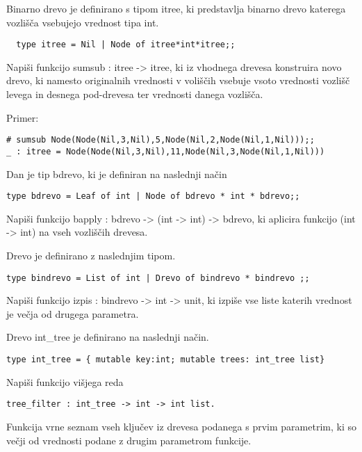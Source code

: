 \begin{ex}
  Binarno drevo je definirano s tipom itree, ki predstavlja binarno
  drevo katerega vozli\v s\v ca vsebujejo vrednost tipa int.
\begin{lstlisting}
  type itree = Nil | Node of itree*int*itree;;
\end{lstlisting}

  Napi\v si funkcijo sumsub : itree -> itree, ki iz vhodnega drevesa
  konstruira novo drevo, ki namesto originalnih vrednosti v voli\v s\v
  cih vsebuje vsoto vrednosti vozli\v s\v c levega in desnega
  pod-drevesa ter vrednosti danega vozli\v s\v ca.

\noindent\/Primer:
\begin{lstlisting}
# sumsub Node(Node(Nil,3,Nil),5,Node(Nil,2,Node(Nil,1,Nil)));;
_ : itree = Node(Node(Nil,3,Nil),11,Node(Nil,3,Node(Nil,1,Nil)))
\end{lstlisting}
\end{ex} 




\begin{ex}
Dan je tip bdrevo, ki je definiran na naslednji na\v cin

\begin{lstlisting}
type bdrevo = Leaf of int | Node of bdrevo * int * bdrevo;;
\end{lstlisting}

Napi\v si funkcijo bapply : bdrevo -> (int -> int) -> bdrevo, ki aplicira funkcijo (int -> int) na vseh vozli\v s\v cih drevesa.  
\end{ex} 





\begin{ex}
Drevo je definirano z naslednjim tipom. 

\begin{lstlisting}
type bindrevo = List of int | Drevo of bindrevo * bindrevo ;; 
\end{lstlisting}

Napi\v si funkcijo izpis : bindrevo -> int -> unit, ki izpi\v se vse liste katerih vrednost je ve\v cja od drugega parametra. 
\end{ex} 





\begin{ex}
  Drevo int\_tree je definirano na naslednji na\v cin.

\begin{lstlisting}
type int_tree = { mutable key:int; mutable trees: int_tree list}
\end{lstlisting}

  Napi\v si funkcijo vi\v sjega reda

\begin{lstlisting}
tree_filter : int_tree -> int -> int list.
\end{lstlisting}

  Funkcija vrne seznam vseh klju\v cev iz drevesa podanega s prvim
  parametrim, ki so ve\v cji od vrednosti podane z drugim parametrom
  funkcije.
\end{ex} 





